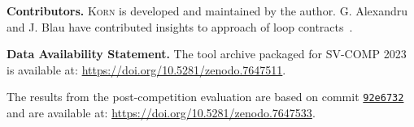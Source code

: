 \documentclass{llncs}
\newcommand{\Korn}{\textsc{Korn}\xspace}
\begin{document}
% 

\smallskip

\noindent\textbf{Contributors.}
\Korn is developed and maintained by the author.
G. Alexandru~\cite{alexandru2019} and J. Blau have contributed
insights to approach of loop contracts~\cite{ernst:vmcai2022}.

\smallskip

\noindent \textbf{Data Availability Statement.}
The tool archive packaged for SV-COMP 2023 is available at:
\url{https://doi.org/10.5281/zenodo.7647511}.

The results from the post-competition evaluation are
based on commit \href{https://github.com/gernst/korn/commit/92e6732645d488a8a7036435f5336d7181c18689}{\tt 92e6732} and are available at:
\url{https://doi.org/10.5281/zenodo.7647533}.



\end{document}
